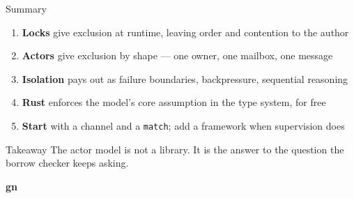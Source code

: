 \begin{frame}{Summary}
  \begin{enumerate}
    \item \textbf{Locks} give exclusion at runtime, leaving order and contention to the author
    \item \textbf{Actors} give exclusion by shape --- one owner, one mailbox, one message
    \item \textbf{Isolation} pays out as failure boundaries, backpressure, sequential reasoning
    \item \textbf{Rust} enforces the model's core assumption in the type system, for free
    \item \textbf{Start} with a channel and a \texttt{match}; add a framework when supervision does
  \end{enumerate}
  \vspace{-0.1cm}
  \begin{exampleblock}{Takeaway}
    The actor model is not a library. It is the answer to the question the
    borrow checker keeps asking.
  \end{exampleblock}
\end{frame}

\begin{frame}[plain]
  \begin{center}
    \vfill
    {\Huge\bfseries\color{stplwhite} gn}
    \vfill
  \end{center}
\end{frame}


